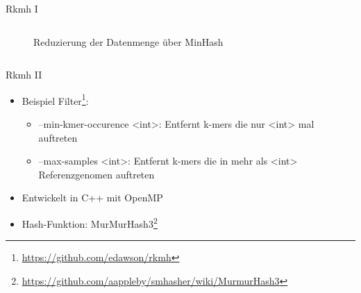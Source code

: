 \begin{frame}{Rkmh I}
\begin{columns}
\begin{column}{.40\textwidth}
\begin{figure}[H]
                \caption{Reduzierung der Datenmenge über MinHash \cite{mashSimilarityImage}}
            \end{figure}
        \end{column}
    \end{columns}
\end{frame}


\begin{frame}{Rkmh II}
    \begin{itemize}
\item Beispiel Filter\footnote{\url{https://github.com/edawson/rkmh}}: 
        \begin{itemize}
            \item --min-kmer-occurence <int>: Entfernt k-mers die nur <int> mal auftreten
            \item --max-samples <int>: Entfernt k-mers die in mehr als <int> Referenzgenomen auftreten
        \end{itemize}
        \item Entwickelt in C++ mit OpenMP
        \item Hash-Funktion: MurMurHash3\footnote{\url{https://github.com/aappleby/smhasher/wiki/MurmurHash3}}
    \end{itemize}
\end{frame}